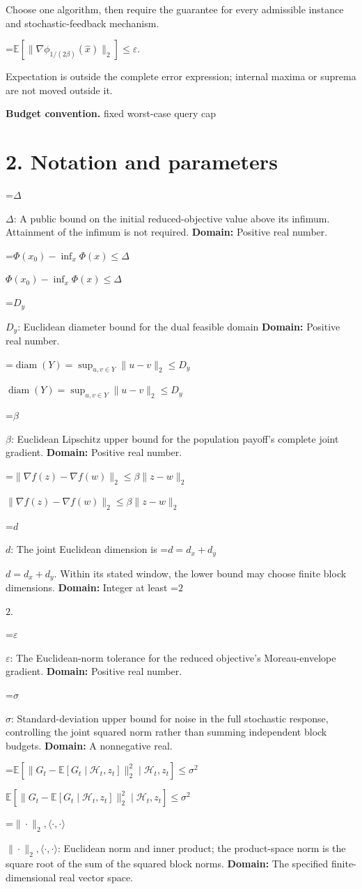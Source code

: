 \documentclass[10pt,a4paper]{article}
\newcommand{\AtlasMath}[1]{\par\begingroup\centering\setbox0=\hbox{$\displaystyle #1$}\ifdim\wd0>1.4\linewidth\typeout{ATLAS WIDE FORMULA: \the\wd0}\fi\ifdim\wd0>\linewidth\resizebox{\linewidth}{!}{\box0}\else\box0\fi\par\endgroup}
\newcommand{\AtlasInlineMath}[1]{\begingroup\setbox0=\hbox{$#1$}\ifdim\wd0>.4\linewidth\endgroup\AtlasMath{#1}\else\endgroup$#1$\fi}
\begin{document}
Choose one algorithm, then require the guarantee for every admissible instance and stochastic-feedback mechanism.


\AtlasMath{\mathbb{E}\!\left[\|\nabla\phi_{1/(2\beta)}(\widehat{x})\|_2\right]\le\varepsilon.}


Expectation is outside the complete error expression; internal maxima or suprema are not moved outside it.

\textbf{Budget convention.} fixed worst-case query cap

\section{2. Notation and parameters}
\AtlasInlineMath{\Delta}: A public bound on the initial reduced-objective value above its infimum. Attainment of the infimum is not required. \textbf{Domain:} Positive real number.

\AtlasInlineMath{\Phi(x_0)-\inf_x\Phi(x)\le\Delta}

\AtlasInlineMath{D_y}: Euclidean diameter bound for the dual feasible domain \textbf{Domain:} Positive real number.

\AtlasInlineMath{\operatorname{diam}(Y)=\sup_{u,v\in Y}\|u-v\|_2\le D_y}

\AtlasInlineMath{\beta}: Euclidean Lipschitz upper bound for the population payoff's complete joint gradient. \textbf{Domain:} Positive real number.

\AtlasInlineMath{\|\nabla f(z)-\nabla f(w)\|_2\le\beta\|z-w\|_2}

\AtlasInlineMath{d}: The joint Euclidean dimension is \AtlasInlineMath{d=d_x+d_y}. Within its stated window, the lower bound may choose finite block dimensions. \textbf{Domain:} Integer at least \AtlasInlineMath{2}.

\AtlasInlineMath{\varepsilon}: The Euclidean-norm tolerance for the reduced objective’s Moreau-envelope gradient. \textbf{Domain:} Positive real number.

\AtlasInlineMath{\sigma}: Standard-deviation upper bound for noise in the full stochastic response, controlling the joint squared norm rather than summing independent block budgets. \textbf{Domain:} A nonnegative real.

\AtlasInlineMath{\mathbb E[\|G_t-\mathbb E[G_t\mid\mathcal H_t,z_t]\|_2^2\mid\mathcal H_t,z_t]\le\sigma^2}

\AtlasInlineMath{\|\cdot\|_2,\langle\cdot,\cdot\rangle}: Euclidean norm and inner product; the product-space norm is the square root of the sum of the squared block norms. \textbf{Domain:} The specified finite-dimensional real vector space.
\end{document}
